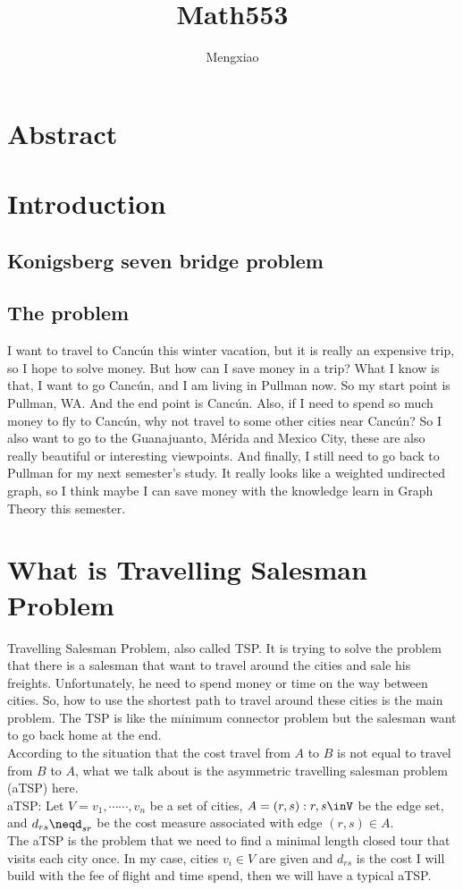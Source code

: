 \documentclass[12pt]{article}
\author{Mengxiao}
\title{Math553}
\begin{document}
    \maketitle
    \pagebreak
    \section{Abstract}
    \section{Introduction}
        \subsection{Konigsberg seven bridge problem}
        \subsection{The problem}
            I want to travel to Canc\'un this winter vacation, but it is really
            an expensive trip, so I hope to solve money. But how can I save money
            in a trip? What I know is that, I want to go Canc\'un, and I am living
            in Pullman now. So my start point is Pullman, WA. And the end point is
            Canc\'un. Also, if I need to spend so much money to fly to Canc\'un,
            why not travel to some other cities near Canc\'un? So I also want to
            go to the Guanajuanto, M\'erida and Mexico City, these are also really
            beautiful or interesting viewpoints. And finally, I still need to go
            back to Pullman for my next semester's study. It really looks like
            a weighted undirected graph, so I think maybe I can save money with
            the knowledge learn in Graph Theory this semester.
    \section{What is Travelling Salesman Problem}
        Travelling Salesman Problem, also called TSP. It is trying to solve
        the problem that there is a salesman that want to travel around the
        cities and sale his freights. Unfortunately, he need to spend money
        or time on the way between cities. So, how to use the shortest path
        to travel around these cities is the main problem. The TSP is like
        the minimum connector problem but the salesman want to go back home
        at the end.\cite{travellingsalesmanproblem}\\
        According to the situation that the cost travel from $A$ to $B$ is not
        equal to travel from $B$ to $A$, what we talk about is the asymmetric
        travelling salesman problem (aTSP) here. \\
        aTSP: Let $V={v_1,\cdots\cdots,v_n}$ be a set of cities, $A={(r,s):r,s\inV}$
        be the edge set, and $d_{rs}\neqd_{sr}$ be the cost measure associated
        with edge $(r,s)\in A$.\cite{matai2010traveling}\\
        The aTSP is the problem that we need to find a minimal length closed tour
        that visits each city once. In my case, cities $v_i\in V$ are given and $d_{rs}$
        is the cost I will build with the fee of flight and time spend, then
        we will have a typical aTSP.
\end{document}
